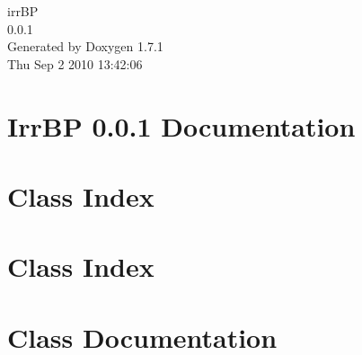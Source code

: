 \documentclass[a4paper]{book}
\begin{document}
\hypersetup{pageanchor=false}
\begin{titlepage}
\vspace*{7cm}
\begin{center}
{\Large irrBP \\[1ex]\large 0.0.1 }\\
\vspace*{1cm}
{\large Generated by Doxygen 1.7.1}\\
\vspace*{0.5cm}
{\small Thu Sep 2 2010 13:42:06}\\
\end{center}
\end{titlepage}
\clearemptydoublepage
{}
\tableofcontents
\clearemptydoublepage
{}
\hypersetup{pageanchor=true}
\chapter{IrrBP 0.0.1 Documentation}
\label{index}\hypertarget{index}{}
\chapter{Class Index}

\chapter{Class Index}

\chapter{Class Documentation}



















\printindex
\end{document}
